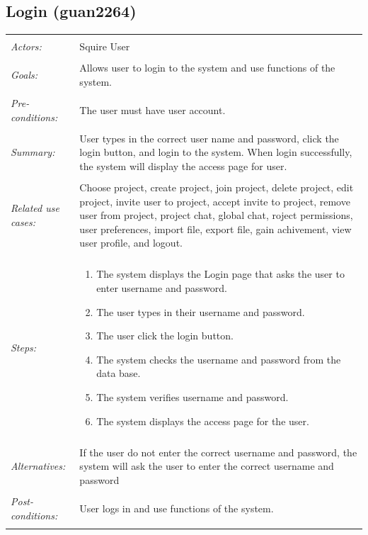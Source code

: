 \documentclass[11pt]{report}
\begin{document}
\subsection{Login (guan2264)}
\begin{tabular}{ p{2cm} p{12cm} }
 \hline
 \\
 \textit{Actors:} & Squire User \\ 
 \\
 \textit{Goals:} & Allows user to login to the system and use functions of the system. \\
 \\
 \textit{Pre-conditions:} & The user must have user account. \\
 \\
 \textit{Summary:} & User types in the correct user name and password, click the login button, and login to the system. When login successfully, the system will display the access page for user. \\ 
 \\
 \textit{Related use cases:} & Choose project, create project, join project, delete project, edit project, invite user to project, accept invite to project, remove user from project, project chat, global chat, roject permissions, user preferences, import file, export file, gain achivement, view user profile, and logout. \\ 
 \\
 \textit{Steps:} & \begin{enumerate}
  \item The system displays the Login page that asks the user to enter username and password.
  \item The user types in their username and password.
  \item The user click the login button.
  \item The system checks the username and password from the data base.
  \item The system verifies username and password.
  \item	The system displays the access page for the user.
 \end{enumerate} \\
 \\
 \textit{Alternatives:} & If the user do not enter the correct username and password, the system will ask the user to enter the correct username and password \\
 \\
 \textit{Post-conditions:} & User logs in and use functions of the system. \\
 \\
\hline
\end{tabular}
\end{document}

